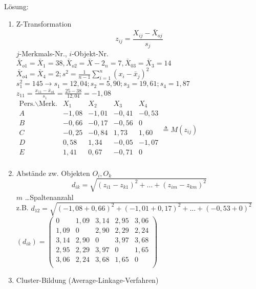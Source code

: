 \documentclass[a4paper]{scrartcl}
\begin{document}
Lösung: \begin{enumerate}
\item Z-Transformation
\[ z_{ij} = \frac{X_{ij} - \bar{X}_{oj}}{s_j}\]
$j$-Merkmals-Nr., $i$-Objekt-Nr.\\
$\bar{X}_{o1} = \bar{X}_1 = 38, \bar{X}_{o2} = \bar{X}-{2_n} = 7, \bar{X}_{03} = \bar{X}_3 = 14$\\
$\bar{X}_{o4} = \bar{X}_4 = 2; s^2 = \frac{1}{n-1} \sum\limits_{i=1}^n (x_i - \bar{x}_j)^2$\\
$s_1^2= 145 \rightarrow s_1 = 12,04; s_2 = 5,90; s_3= 19,61; s_4 = 1,87$\\
$z_{11} = \frac{x_{11} -\bar{x}_{o1}}{s_1} = \frac{25-38}{12,04} = -1,08$\\
$\begin{array}{c|cccc}
\text{Pers.} \backslash \text{Merk.} & X_1 & X_2 & X_3 & X_4 \\ \hline
A & -1,08 & - 1,01  & -0,41 & -0,53 \\
B & -0,66 & -0,17 & -0,56 & 0 \\
C & -0,25 & -0,84 & 1,73 & 1,60 \\
D & 0,58 & 1,34 & -0,05 & -1,07\\
E & 1,41 & 0,67 & -0,71 & 0 \\
\end{array} \triangleq M(z_{ij})$\\
\item Abstände zw. Objekten $O_i,O_k$
\[ d_{ik} = \sqrt{(z_{i1} - z_{k1})^2 + \dots + (z_{im} - z_{km})^2}\] $m$ \dots Spaltenanzahl\\
z.B. $d_{12} = \sqrt{(-1,08 + 0,66)^2 + (-1,01 + 0,17)^2 + \dots + (-0,53 + 0)^2}$ \\
$(d_{ik}) = \left( \begin{array}{ccccc}
0 & 1,09 & 3,14 & 2,95 & 3,06\\
1,09 & 0 & 2,90 & 2,29 & 2,24\\
3,14 & 2,90 & 0 & 3,97 & 3,68\\
2,95 & 2,29 & 3,97 & 0 & 1,65\\
3,06 & 2,24 & 3,68 & 1,65 & 0\\
\end{array}\right)$\\
\item Cluster-Bildung (Average-Linkage-Verfahren)
\end{enumerate}
\end{document}
